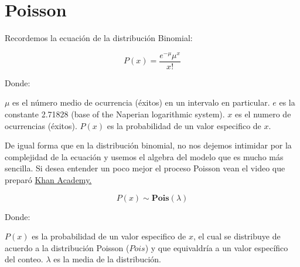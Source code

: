\documentclass[
]{book}
\begin{document}
\hypertarget{poisson}{%
\section{Poisson}\label{poisson}}

Recordemos la ecuación de la distribución Binomial:

\begin{equation} 
  P\left( x \right) = \frac{{e^{ - \mu } \mu ^x }}{{x!}}
  \label{eq:binom}
\end{equation}

Donde:

\(\mu\) es el número medio de ocurrencia (éxitos) en un intervalo en particular.
\(e\) es la constante 2.71828 (base of the Naperian logarithmic system).
\(x\) es el numero de ocurrencias (éxitos).
\(P(x)\) es la probabilidad de un valor especifico de \(x\).

De igual forma que en la distribución binomial, no nos dejemos intimidar por la complejidad de la ecuación y usemos el algebra del modelo que es mucho más sencilla. Si desea entender un poco mejor el proceso Poisson vean el video que preparó \href{https://www.youtube.com/watch?v=Vhjiw8r8kR4}{Khan Academy.}

\begin{equation} 
  P\left( x \right) \sim \mathbf{Pois}(\lambda)
  \label{eq:binom}
\end{equation}

Donde:

\(P(x)\) es la probabilidad de un valor especifico de \(x\), el cual se distribuye de acuerdo a la distribución Poisson (\(Pois\)) y que equivaldría a un valor específico del conteo.
\(\lambda\) es la media de la distribución.
\end{document}
